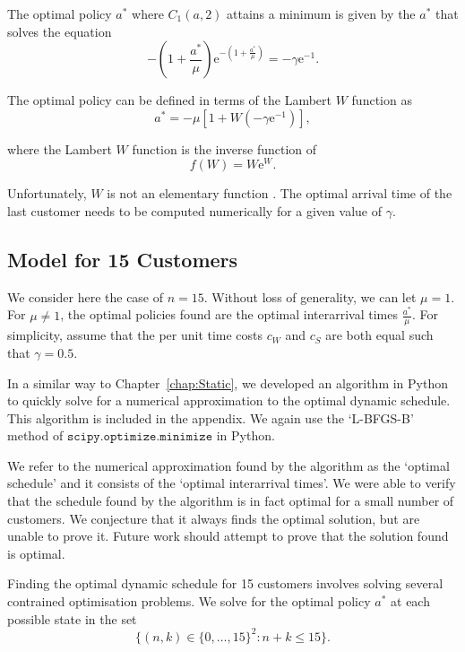 The optimal policy $a^{*}$ where $C_{1} (a, 2)$ attains a minimum is given by the $a^{*}$ that solves the equation
\begin{equation}
	- \left( 1 + \frac{a^{*}}{\mu} \right) \mathrm{e}^{- \left( 1 + \frac{a^{*}}{\mu} \right)} = - \gamma \mathrm{e}^{-1}.
\end{equation}

The optimal policy can be defined in terms of the Lambert $W$ function as
\begin{equation}
	a^{*} = - \mu \left[ 1 + W \left( - \gamma \mathrm{e}^{-1} \right) \right],
\end{equation}

where the Lambert $W$ function is the inverse function of
\begin{equation}
	f (W) = W \mathrm{e}^{W}.
\end{equation}

Unfortunately, $W$ is not an elementary function \citep{Chow}. The optimal arrival time of the last customer needs to be computed numerically for a given value of $\gamma$.

\subsection{Model for 15 Customers}
We consider here the case of $n = 15$. Without loss of generality, we can let $\mu = 1$. For $\mu \neq 1$, the optimal policies found are the optimal interarrival times $\frac{a^{*}}{\mu}$. For simplicity, assume that the per unit time costs $c_{W}$ and $c_{S}$ are both equal such that $\gamma = 0.5$.

In a similar way to Chapter~\ref{chap:Static}, we developed an algorithm in Python to quickly solve for a numerical approximation to the optimal dynamic schedule. This algorithm is included in the appendix. We again use the `L-BFGS-B' method of $\texttt{scipy.optimize.minimize}$ in Python.

We refer to the numerical approximation found by the algorithm as the `optimal schedule' and it consists of the `optimal interarrival times'. We were able to verify that the schedule found by the algorithm is in fact optimal for a small number of customers. We conjecture that it always finds the optimal solution, but are unable to prove it. Future work should attempt to prove that the solution found is optimal.

Finding the optimal dynamic schedule for 15 customers involves solving several contrained optimisation problems. We solve for the optimal policy $a^{*}$ at each possible state in the set
\begin{equation}
	\Big\{ (n, k) \in \{ 0, \ldots, 15 \}^{2} : n + k \leq 15 \Big\}.
\end{equation}

